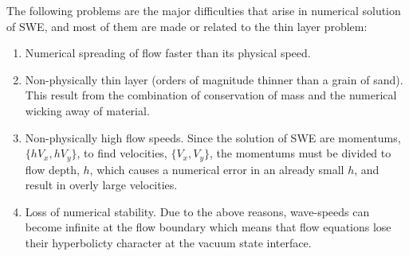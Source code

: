 \documentclass[letterpaper,10pt]{article}
\begin{document}
The following problems are the major difficulties that arise in numerical solution of SWE, and most 
of them are made or related to the thin layer problem:

\begin{enumerate}
\item \label{problemwicking}
      Numerical spreading of flow faster than its physical speed.      
\item \label{problemtoothin}
      Non-physically thin layer (orders of magnitude thinner than a grain of sand). This result from the combination of 
      conservation of mass and the numerical wicking away of material.
\item \label{problemtoofast}
      Non-physically high flow speeds.  Since the solution of SWE are momentums, $\{hV_x,hV_y\}$, to find velocities, 
      $\{V_x,V_y\}$, the momentums must be divided to flow depth, $h$, which causes a numerical error in an already 
      small $h$, and result in overly large velocities.
\item \label{problemunstable}
      Loss of numerical stability.  Due to the above reasons, wave-speeds can become infinite at the flow boundary
      which means that flow equations lose their hyperbolicty character at the vacuum state interface.
\end{enumerate}\label{thinprob}
\end{document}
